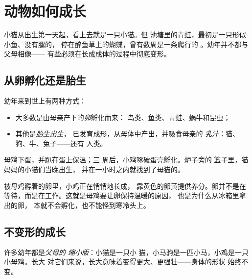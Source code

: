 \chapter{动物如何成长}\label{ch:g2:animals-grow-up}

小猫从出生第一天起，看上去就是一只小猫。但
池塘里的青蛙，最初是一只形似小鱼、没有腿的，
停在醉鱼草上的蝴蝶，曾有数周是一条爬行的
。幼年并不都与父母相像——
有些必须在长成成体的过程中彻底变形。

\section{从卵孵化还是胎生}

\begin{definition}[两种出生方式]\label{def:g2:animals-grow-up:born}
幼年来到世上有两种方式：
\begin{itemize}
  \item 大多数是由母亲产下的\emph{卵}孵化而来：
        鸟类、鱼类、青蛙、蜗牛和昆虫；
  \item 其他是\emph{胎生出生}，
        已发育成形，从母体中产出，并吸食母亲的
        \emph{乳汁}：猫、狗、牛、兔子——还有
        人类。
\end{itemize}
\end{definition}

\begin{example}[鸡舍与篮子]\label{ex:g2:animals-grow-up:henhouse}
母鸡下蛋，并趴在蛋上保温；三
周后，小鸡啄破蛋壳孵化。炉子旁的
篮子里，猫妈妈的小猫们当晚出生，
并在一小时之内就找到了母猫的。
\end{example}

\begin{remark}[卵不是石头]\label{rem:g2:animals-grow-up:egg}
被母鸡孵着的卵里，小鸡正在悄悄地长成，
靠黄色的卵黄提供养分。卵并不是在等待，而是在工作。这就是母鸡要让卵保持温暖的原因，
也是为什么从冰箱里拿出的卵，
本就不会孵化，也不能怪到寒冷头上。
\end{remark}

\section{不变形的成长}

\begin{definition}[像父母一样成长]\label{def:g2:animals-grow-up:direct}
许多幼年都是\emph{父母的
缩小版}：小猫是一只小
猫，小马驹是一匹小马，小鸡是一只小母鸡。长大
对它们来说，长大意味着变得更大、更强壮——身体的形状
始终不变。
\end{definition}

